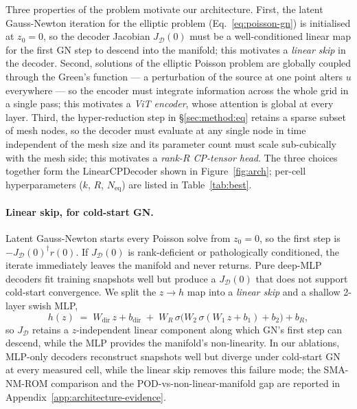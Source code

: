 \documentclass{article}
\begin{document}
Three properties of the problem motivate our architecture. First,
the latent Gauss-Newton iteration for the elliptic problem
(Eq.~\ref{eq:poisson-gn}) is initialised at $z_0 = 0$, so the decoder
Jacobian $J_\mathcal{D}(0)$ must be a well-conditioned linear map for
the first GN step to descend into the manifold; this motivates a
\emph{linear skip} in the decoder. Second, solutions of the elliptic
Poisson problem are globally coupled through the Green's function ---
a perturbation of the source at one point alters $u$ everywhere ---
so the encoder must integrate information across the whole grid in a
single pass; this motivates a \emph{ViT encoder}, whose attention is
global at every layer. Third, the hyper-reduction step in
\S\ref{sec:method:eq} retains a sparse subset of mesh nodes, so the
decoder must evaluate at any single node in time independent of the
mesh size and its parameter count must scale sub-cubically with the
mesh side; this motivates a \emph{rank-$R$ CP-tensor head}. The three
choices together form the LinearCPDecoder shown in
Figure~\ref{fig:arch}; per-cell hyperparameters
($k$, $R$, $N_\mathrm{eq}$) are listed in Table~\ref{tab:best}.

\paragraph{Linear skip, for cold-start GN.}
Latent Gauss-Newton starts every Poisson solve from $z_0 = 0$, so the
first step is $-J_\mathcal{D}(0)^\dagger r(0)$. If $J_\mathcal{D}(0)$
is rank-deficient or pathologically conditioned, the iterate
immediately leaves the manifold and never returns. Pure deep-MLP
decoders fit training snapshots well but produce a $J_\mathcal{D}(0)$
that does not support cold-start convergence. We split the $z \to h$
map into a \emph{linear skip} and a shallow 2-layer swish MLP,
\begin{equation}
  h(z) \;=\;
  W_\mathrm{dir}\, z + b_\mathrm{dir}
  \;+\;
  W_R\, \sigma\!\bigl(W_2\, \sigma(W_1\, z + b_1) + b_2\bigr) + b_R,
  \label{eq:decoder-branches}
\end{equation}
so $J_\mathcal{D}$ retains a $z$-independent linear component along
which GN's first step can descend, while the MLP provides the
manifold's non-linearity. In our ablations, MLP-only decoders
reconstruct snapshots well but diverge under cold-start GN at every
measured cell, while the linear skip removes this failure mode; the
SMA-NM-ROM \citep{KimChoi2022NMROM} comparison and the
POD-vs-non-linear-manifold gap are reported in
Appendix~\ref{app:architecture-evidence}.
\end{document}
